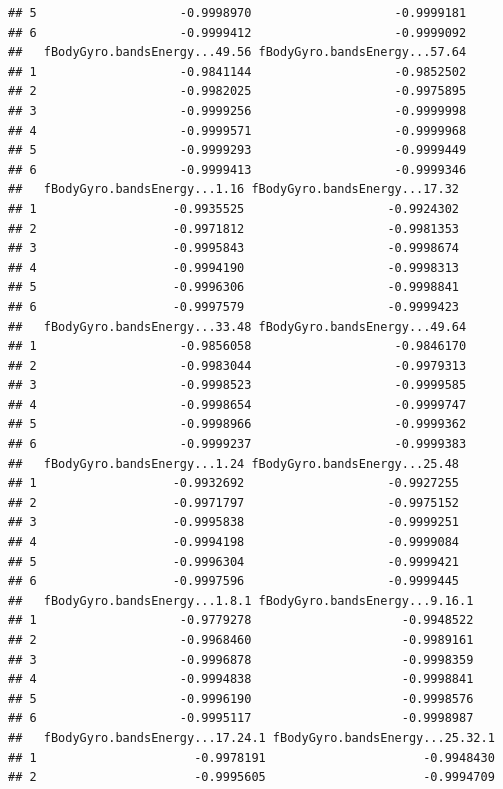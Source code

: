 \documentclass[
]{article}
\begin{document}
\begin{verbatim}
## 5                    -0.9998970                    -0.9999181
## 6                    -0.9999412                    -0.9999092
##   fBodyGyro.bandsEnergy...49.56 fBodyGyro.bandsEnergy...57.64
## 1                    -0.9841144                    -0.9852502
## 2                    -0.9982025                    -0.9975895
## 3                    -0.9999256                    -0.9999998
## 4                    -0.9999571                    -0.9999968
## 5                    -0.9999293                    -0.9999449
## 6                    -0.9999413                    -0.9999346
##   fBodyGyro.bandsEnergy...1.16 fBodyGyro.bandsEnergy...17.32
## 1                   -0.9935525                    -0.9924302
## 2                   -0.9971812                    -0.9981353
## 3                   -0.9995843                    -0.9998674
## 4                   -0.9994190                    -0.9998313
## 5                   -0.9996306                    -0.9998841
## 6                   -0.9997579                    -0.9999423
##   fBodyGyro.bandsEnergy...33.48 fBodyGyro.bandsEnergy...49.64
## 1                    -0.9856058                    -0.9846170
## 2                    -0.9983044                    -0.9979313
## 3                    -0.9998523                    -0.9999585
## 4                    -0.9998654                    -0.9999747
## 5                    -0.9998966                    -0.9999362
## 6                    -0.9999237                    -0.9999383
##   fBodyGyro.bandsEnergy...1.24 fBodyGyro.bandsEnergy...25.48
## 1                   -0.9932692                    -0.9927255
## 2                   -0.9971797                    -0.9975152
## 3                   -0.9995838                    -0.9999251
## 4                   -0.9994198                    -0.9999084
## 5                   -0.9996304                    -0.9999421
## 6                   -0.9997596                    -0.9999445
##   fBodyGyro.bandsEnergy...1.8.1 fBodyGyro.bandsEnergy...9.16.1
## 1                    -0.9779278                     -0.9948522
## 2                    -0.9968460                     -0.9989161
## 3                    -0.9996878                     -0.9998359
## 4                    -0.9994838                     -0.9998841
## 5                    -0.9996190                     -0.9998576
## 6                    -0.9995117                     -0.9998987
##   fBodyGyro.bandsEnergy...17.24.1 fBodyGyro.bandsEnergy...25.32.1
## 1                      -0.9978191                      -0.9948430
## 2                      -0.9995605                      -0.9994709

\end{verbatim}
\end{document}
